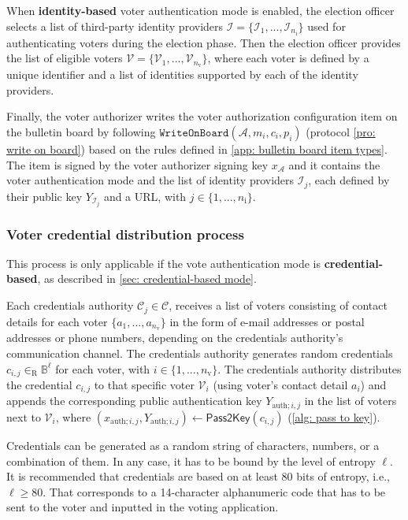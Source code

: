 When \textbf{identity-based} voter authentication mode is enabled, the election officer selects a list of third-party identity providers $\boldsymbol{\mathcal{I}} = \{ \mathcal{I}_1, ..., \mathcal{I}_{n_\mathrm{i}} \}$ used for authenticating voters during the election phase. Then the election officer provides the list of eligible voters $\boldsymbol{\mathcal{V}} = \{ \mathcal{V}_1, ..., \mathcal{V}_{n_\mathrm{v}} \}$, where each voter is defined by a unique identifier and a list of identities supported by each of the identity providers.

Finally, the voter authorizer writes the voter authorization configuration item on the bulletin board by following $\mathtt{WriteOnBoard}(\mathcal{A}, m_i, c_i, p_i)$ (protocol \ref{pro: write on board}) based on the rules defined in \cref{app: bulletin board item types}. The item is signed by the voter authorizer signing key $x_\mathcal{A}$ and it contains the voter authentication mode and the list of identity providers $\mathcal{I}_j$, each defined by their public key $Y_{\mathcal{I}_j}$ and a URL, with $j \in \{ 1, ..., n_\mathrm{i} \}$.


\subsubsection{Voter credential distribution process} \label{sec: voter credential distribution process}
This process is only applicable if the vote authentication mode is \textbf{credential-based}, as described in \cref{sec: credential-based mode}.

Each credentials authority $\mathcal{C}_j \in \boldsymbol{\mathcal{C}}$, receives a list of voters consisting of contact details for each voter $\{ a_1, ..., a_{n_\mathrm{v}} \}$ in the form of e-mail addresses or postal addresses or phone numbers, depending on the credentials authority's communication channel. The credentials authority generates random credentials $c_{i, j} \in_\mathrm{R} \mathbb{B}^\ell$ for each voter, with $i \in \{ 1, ..., n_\mathrm{v} \}$. The credentials authority distributes the credential $c_{i, j}$ to that specific voter $\mathcal{V}_i$ (using voter's contact detail $a_i$) and appends the corresponding public authentication key $Y_{\mathrm{auth}; i, j}$ in the list of voters next to $\mathcal{V}_i$, where $(x_{\mathrm{auth}; i, j}, Y_{\mathrm{auth}; i, j}) \gets \mathsf{Pass2Key}(c_{i, j})$ (\cref{alg: pass to key}).

Credentials can be generated as a random string of characters, numbers, or a combination of them. In any case, it has to be bound by the level of entropy $\ell$. It is recommended that credentials are based on at least 80 bits of entropy, i.e., $\ell \geq 80$. That corresponds to a 14-character alphanumeric code that has to be sent to the voter and inputted in the voting application.

